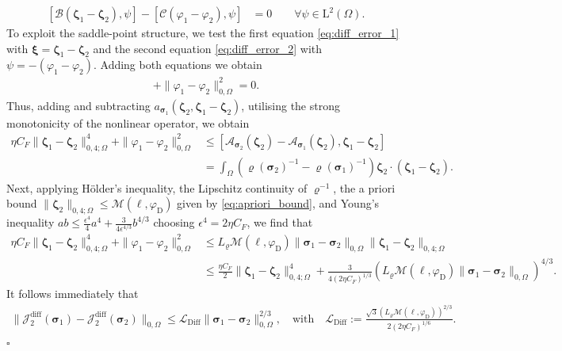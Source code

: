 \documentclass[fleqn,a4paper]{cas-sc}
\newcommand{\bxi}{\boldsymbol{\xi}}
\newcommand{\bzeta}{\boldsymbol{\zeta}}
\newcommand{\0}{\boldsymbol{0}}
\newcommand\cA{\mathcal{A}}
\newcommand\cB{\mathcal{B}}
\newcommand\cC{\mathcal{C}}
\newcommand\cJ{\mathcal{J}}
\newcommand\rL{\mathrm{L}}
\newcommand\bsigma{\boldsymbol{\sigma}}
\numberwithin{equation}{section}
\numberwithin{figure}{section}
\newenvironment{proof}{\noindent{\it Proof.}}{\hfill$\square$}
\begin{document}
\begin{proof}
\begin{subequations}
\begin{align}
        [\cB(\bzeta_{1}-\bzeta_{2}),  \psi] - [\cC(\varphi_{1}-\varphi_{2}), \psi] &= 0 \qquad \forall \psi \in \rL^2(\Omega). \label{eq:diff_error_2}
    \end{align}
    \end{subequations}
To exploit the saddle-point structure, we test the first equation \eqref{eq:diff_error_1} with $\bxi = \bzeta_1 - \bzeta_2$ and the second equation \eqref{eq:diff_error_2} with $\psi = -(\varphi_1 - \varphi_2)$. Adding both equations we obtain
\begin{align*}
    [\cA_{{\bsigma}_1}(\bzeta_1) - \cA_{{\bsigma}_2}(\bzeta_2), \bzeta_1 - \bzeta_2] + \|\varphi_1 - \varphi_2\|_{0,\Omega}^2 = 0.
\end{align*}
Thus, adding and subtracting $a_{{\bsigma}_1}(\bzeta_2, \bzeta_1 - \bzeta_2)$, utilising the strong monotonicity of the nonlinear operator, we obtain
\begin{align*}%
   \eta C_F \|\bzeta_1 - \bzeta_2\|_{0,4;\Omega}^4 + \|\varphi_1 - \varphi_2\|_{0,\Omega}^2 &\leq [\cA_{{\bsigma}_2}(\bzeta_2) - \cA_{{\bsigma}_1}(\bzeta_2), \bzeta_1 - \bzeta_2] \nonumber \\
    &= \int_{\Omega} \left( \varrho({\bsigma}_2)^{-1} - \varrho({\bsigma}_1)^{-1} \right) \bzeta_2 \cdot (\bzeta_1 - \bzeta_2) .
\end{align*}
Next, applying Hölder's inequality, the Lipschitz continuity of $\varrho^{-1}$, the a priori bound $\|\bzeta_2\|_{0,4;\Omega} \leq \mathcal{M}(\ell, \varphi_{\mathrm{D}})$ given by \eqref{eq:apriori_bound}, and Young's inequality $\displaystyle ab \leq \frac{\epsilon^4}{4}a^4 + \frac{3}{4\epsilon^{4/3}}b^{4/3}$ choosing $\epsilon^4 = 2\eta C_F$, we find that
\begin{align*}
   \eta C_F \|\bzeta_1 - \bzeta_2\|_{0,4;\Omega}^4 + \|\varphi_1 - \varphi_2\|_{0,\Omega}^2 &
    \leq L_\varrho \mathcal{M}(\ell, \varphi_{\mathrm{D}}) \|{\bsigma}_1 - {\bsigma}_2\|_{0,\Omega} \|\bzeta_1 - \bzeta_2\|_{0,4;\Omega}\\
    & \leq \frac{\eta C_F}{2} \|\bzeta_1 - \bzeta_2\|_{0,4;\Omega}^4 + \frac{3}{4(2\eta C_F)^{1/3}} \left( L_\varrho \mathcal{M}(\ell, \varphi_{\mathrm{D}}) \|{\bsigma}_1 - {\bsigma}_2\|_{0,\Omega} \right)^{4/3}.
\end{align*}
It follows immediately that
\begin{align}\label{continuity-tilde-assited}
\|\cJ_{2}^{\mathrm{diff}}({\bsigma}_{1})-\cJ_{2}^{\mathrm{diff}}({\bsigma}_{2})\|_{0,\Omega} \leq \mathcal{L}_{\mathrm{Diff}} \|{\bsigma}_{1}-{\bsigma}_{2}\|_{0, \Omega}^{2/3}, \quad \text{with} \quad \mathcal{L}_{\mathrm{Diff}} := \frac{\sqrt{3} (L_\varrho \mathcal{M}(\ell, \varphi_{\mathrm{D}}))^{2/3}}{2(2\eta C_F)^{1/6}}.

\end{align}
\end{proof}
\end{document}
